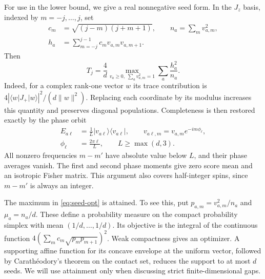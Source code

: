 \documentclass[aps,pra,reprint,superscriptaddress,longbibliography]{revtex4-2}
\theoremstyle{remark}
\newcommand{\norm}[1]{\lVert#1\rVert}
\newcommand{\ket}[1]{\lvert#1\rangle}
\newcommand{\bra}[1]{\langle#1\rvert}
\begin{document}
For use in the lower bound, we give a real nonnegative seed form. In
the $J_z$ basis, indexed by $m=-j,\ldots,j$, set
\begin{equation}
\begin{aligned}
c_m&=\sqrt{(j-m)(j+m+1)},\qquad
n_a=\sum_m v_{a,m}^2,\\
h_a&=\sum_{m=-j}^{j-1}c_mv_{a,m}v_{a,m+1}.
\end{aligned}
\label{eq:seeds}
\end{equation}
Then
\begin{equation}
 T_j=\frac4d\max_{v_a\geq0,\;\sum_a v_{a,m}^2=1}
 \sum_a\frac{h_a^2}{n_a}.
 \label{eq:seed-opt}
\end{equation}
Indeed, for a complex rank-one vector $w$ its trace contribution is
$4|\bra wJ_+\ket w|^2/(d\norm w^2)$. Replacing each coordinate by
its modulus increases this quantity and preserves diagonal
populations. Completeness is then restored exactly by the phase
orbit
\begin{equation}
\begin{aligned}
E_{a\ell}&=\frac1L\ket{v_{a\ell}}\bra{v_{a\ell}},\qquad
v_{a\ell,m}=v_{a,m}e^{-im\phi_\ell},\\
\phi_\ell&=\frac{2\pi\ell}{L},\qquad L\geq\max(d,3).
\end{aligned}
\label{eq:phase-orbit}
\end{equation}
All nonzero frequencies $m-m'$ have absolute value below $L$, and
their phase averages vanish. The first and second phase moments give
zero score mean and an isotropic Fisher matrix. This argument also
covers half-integer spins, since $m-m'$ is always an integer.

The maximum in \eqref{eq:seed-opt} is attained. To see this, put
$p_{a,m}=v_{a,m}^2/n_a$ and $\mu_a=n_a/d$. These define a probability
measure on the compact probability simplex with mean
$(1/d,\ldots,1/d)$. Its objective is the integral of the continuous
function $4(\sum_mc_m\sqrt{p_mp_{m+1}})^2$. Weak compactness gives
an optimizer. A supporting affine function for its concave envelope
at the uniform vector, followed by Carath\'eodory's theorem on the
contact set, reduces the support to at most $d$ seeds. We will use
attainment only when discussing strict finite-dimensional gaps.
\end{document}
